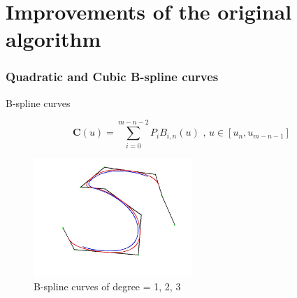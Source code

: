 \documentclass[english,10pt,presentation]{beamer}
\begin{document}
\section{Improvements of the original algorithm}
\label{sec-5}
\begin{frame}
\frametitle{Quadratic and Cubic B-spline curves}
\label{sec-5_1}
\begin{exampleblock}{B-spline curves}
\label{sec-5_1_1}

\begin{equation*}
  \mathbf{C}(u) =  \sum_{i=0}^{m-n-2} P_{i} B_{i,n}(u) \mbox{ , } u \in [u_{n},u_{m-n-1}]
\end{equation*}
\begin{figure}[htb]
\centering
\includegraphics[width=6cm,angle=0]{./bspline.jpg}
\caption{\label{fig: bspline}B-spline curves of degree = 1, 2, 3}
\end{figure}
\end{exampleblock}
\end{frame}
\end{document}
